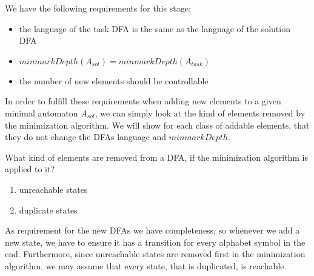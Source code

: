 \documentclass[a4paper, oneside, 11pt]{report}
\theoremstyle{definition}
\theoremstyle{remark}
\newcommand{\gregorColor}{Violet}
\newcommand{\gregor}[1]{\textcolor{\gregorColor}{\textbf{Gregor:} #1}}
\begin{document}
%		
%
%
%

We have the following requirements for this stage:
\begin{itemize}
	\item the language of the task DFA is the same as the language of the solution DFA
	\item $minmarkDepth(A_{sol}) = minmarkDepth(A_{task})$
	\item the number of new elements should be controllable
\end{itemize}
In order to fulfill these requirements when adding new elements to a given minimal automaton $A_{sol}$, we can simply look at the kind of elements removed by the minimization algorithm. We will show for each class of addable elements, that they do not change the DFAs language and $minmarkDepth$.

What kind of elements are removed from a DFA, if the minimization algorithm is applied to it?
\begin{enumerate}
	\item unreachable states
	\item duplicate states
\end{enumerate}
As requirement for the new DFAs we have completeness, so whenever we add a new state, we have to ensure it has a transition for every alphabet symbol in the end. Furthermore, since unreachable states are removed first in the minimization algorithm, we may assume that every state, that is duplicated, is reachable.
\end{document}
